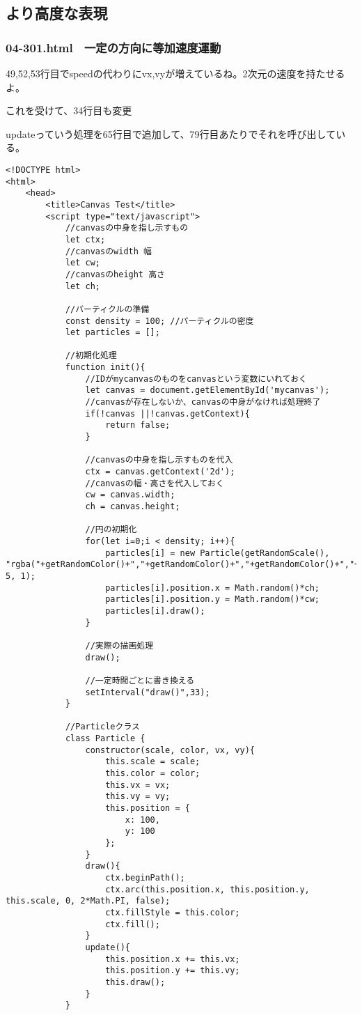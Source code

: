 \documentclass[mingoth,11pt,a4j,uplatex]{jsarticle}
\begin{document}
\subsection{より高度な表現}
\subsubsection{04-301.html　一定の方向に等加速度運動}
49,52,53行目でspeedの代わりにvx,vyが増えているね。2次元の速度を持たせるよ。

これを受けて、34行目も変更

updateっていう処理を65行目で追加して、79行目あたりでそれを呼び出している。

\begin{lstlisting}[caption=一定の方向に等加速度運動]
<!DOCTYPE html>
<html>
	<head>
		<title>Canvas Test</title>
		<script type="text/javascript">
			//canvasの中身を指し示すもの
			let ctx;
			//canvasのwidth 幅
			let cw;
			//canvasのheight 高さ
			let ch;
			
			//パーティクルの準備
			const density = 100; //パーティクルの密度
			let particles = [];
			
			//初期化処理
			function init(){
				//IDがmycanvasのものをcanvasという変数にいれておく
				let canvas = document.getElementById('mycanvas');
				//canvasが存在しないか、canvasの中身がなければ処理終了
				if(!canvas ||!canvas.getContext){
					return false;
				}
				
				//canvasの中身を指し示すものを代入
				ctx = canvas.getContext('2d');
				//canvasの幅・高さを代入しておく
				cw = canvas.width;
				ch = canvas.height;
				
				//円の初期化
				for(let i=0;i < density; i++){
					particles[i] = new Particle(getRandomScale(), "rgba("+getRandomColor()+","+getRandomColor()+","+getRandomColor()+","+getRandomAlpha()+")", 5, 1);
					particles[i].position.x = Math.random()*ch;
					particles[i].position.y = Math.random()*cw;
					particles[i].draw();			
				}
				
				//実際の描画処理
				draw();
				
				//一定時間ごとに書き換える
				setInterval("draw()",33);
			}

			//Particleクラス
			class Particle {
				constructor(scale, color, vx, vy){
					this.scale = scale;
					this.color = color;
					this.vx = vx;
					this.vy = vy;
					this.position = {
						x: 100,
						y: 100
					};
				}
				draw(){
					ctx.beginPath();
					ctx.arc(this.position.x, this.position.y, this.scale, 0, 2*Math.PI, false);
					ctx.fillStyle = this.color;
					ctx.fill();
				}
				update(){
					this.position.x += this.vx;
					this.position.y += this.vy;
					this.draw();
				}
			}
			

\end{lstlisting}
\end{document}
